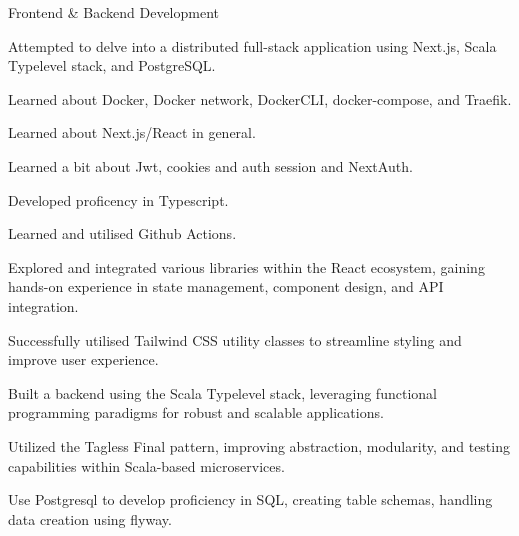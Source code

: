 
\begin{cventries}

  \cventry
    {Frontend \& Backend Development} %
    {} %
    {} %
    {} %
    {
      \begin{cvitems} %
        \item {Attempted to delve into a distributed full-stack application using Next.js, Scala Typelevel stack, and PostgreSQL.}
        \item {Learned about Docker, Docker network, DockerCLI, docker-compose, and Traefik.}
        \item {Learned about Next.js/React in general.}
        \item {Learned a bit about Jwt, cookies and auth session and NextAuth.}
        \item {Developed proficency in Typescript.}
        \item {Learned and utilised Github Actions.}
        \item {Explored and integrated various libraries within the React ecosystem, gaining hands-on experience in state management, component design, and API integration.}
        \item {Successfully utilised Tailwind CSS utility classes to streamline styling and improve user experience.}
        \item {Built a backend using the Scala Typelevel stack, leveraging functional programming paradigms for robust and scalable applications.}
        \item {Utilized the Tagless Final pattern, improving abstraction, modularity, and testing capabilities within Scala-based microservices.}
        \item {Use Postgresql to develop proficiency in SQL, creating table schemas, handling data creation using flyway.}
      \end{cvitems}
    }


\end{cventries}
